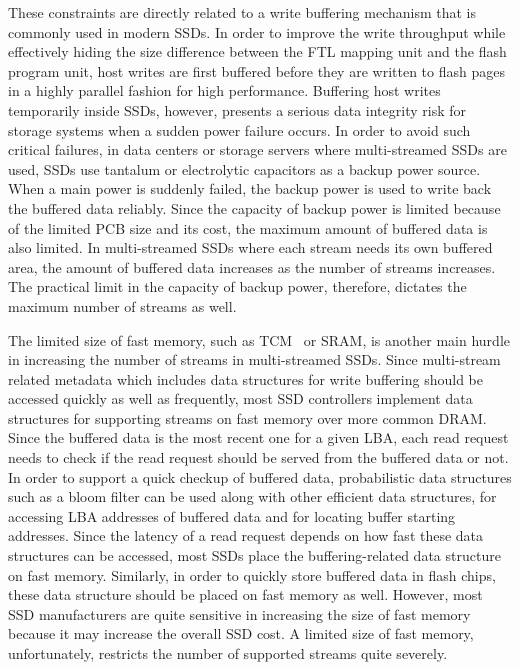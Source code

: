 These constraints are directly related to a write buffering mechanism that is 
commonly used in modern SSDs.   In order to improve the write throughput while 
effectively hiding the size difference
between the FTL mapping unit and the flash program unit, host writes are first buffered 
before they are written to flash pages in a highly parallel fashion for high performance.  
Buffering host writes temporarily inside SSDs, however, presents a serious data integrity 
risk for storage systems when a sudden power failure occurs.  
In order to avoid such critical failures, in data centers or storage servers 
where multi-streamed SSDs are used,
SSDs use tantalum or electrolytic capacitors as a backup power source.  
When a main power is suddenly failed, the backup power is used to write back the
buffered data reliably.  
Since the capacity of backup power is limited because of the limited PCB size and 
its cost, the maximum amount of buffered data is also limited.  
In multi-streamed SSDs where
each stream needs its own buffered area, the amount of buffered data increases 
as the number of streams increases.  
The practical limit in the capacity of backup power, therefore, dictates the maximum
number of streams as well.

The limited size of fast memory, such as TCM~\cite{TCM} or SRAM, is another main hurdle in increasing 
the number of streams in multi-streamed SSDs.
Since multi-stream related metadata which includes data structures for write buffering 
should be accessed quickly as well as frequently, 
most SSD controllers implement data structures for supporting streams on fast memory over more common DRAM. 
Since the buffered data is the 
most recent one for a given LBA, each read request needs to check if the read request 
should be served from the buffered data or not.
In order to support a quick checkup of buffered data, probabilistic data structures
such as a bloom filter can be used along with other efficient data structures, 
for accessing LBA
addresses of buffered data and for locating buffer starting addresses.   
Since the latency of a read request depends on how fast these data structures 
can be accessed, most SSDs place the
buffering-related data structure on fast memory.   
Similarly, in order to quickly store buffered data in flash chips, these data structure 
should be placed on fast memory as well.
However, most SSD manufacturers are quite sensitive in increasing the size of 
fast memory because it may increase the overall SSD cost.   
A limited size of fast memory, unfortunately, restricts the number of
supported streams quite severely.

